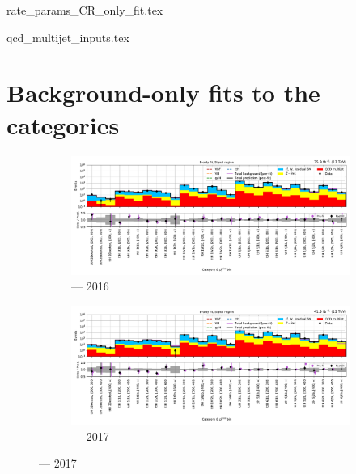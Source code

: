 \clearpage




{rate_params_CR_only_fit.tex}
\clearpage




{qcd_multijet_inputs.tex}
\clearpage




\section{Background-only fits to the \texorpdfstring{\ttH}{ttH} categories}
\label{sec:B_only_fit_plots_ttH_SR}

\begin{figure}[htbp]
    \centering
    \begin{subfigure}[b]{0.79\textwidth}
        \includegraphics[width=\textwidth]{chapters/higgstoinv/figures/mountain_ranges/2016/ttH/SR_tree_fit_b-abs_values_ttH_cats.pdf}
        \caption{\ttH --- 2016}
    \end{subfigure}

    \begin{subfigure}[b]{0.79\textwidth}
        \includegraphics[width=\textwidth]{chapters/higgstoinv/figures/mountain_ranges/2017/ttH/SR_tree_fit_b-abs_values_ttH_cats.pdf}
        \caption{\ttH --- 2017}
    \end{subfigure}


\end{figure}
